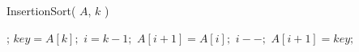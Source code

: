 \documentclass[mathserif]{beamer}
\begin{document}
{%
% 
% 
{\sc InsertionSort}( $A$, $k$ ) 
\begin{algorithmic}[1]
	\RETURN;
\ENDIF
{}
\STATE $key = A[k];$ 
\STATE $i = k - 1;$
	\STATE $A[i+1] = A[i];$ 
	\STATE $i--;$
\ENDWHILE
\STATE $A[i+1] = key;$
\end{algorithmic}


%    
% 
% 
% 
%
%  
%
%     
%
%
%
} 
\end{document}
